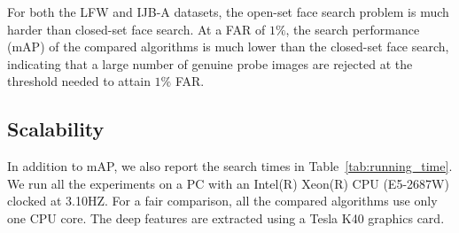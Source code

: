 \documentclass[10pt,journal,compsoc]{IEEEtran}
\begin{document}
For both the LFW and IJB-A datasets, the open-set face search problem is much harder than closed-set face search. At a FAR of $1\%$, the search performance (mAP) of the compared algorithms is much lower than the closed-set face search, indicating that a large number of genuine probe images are rejected at the threshold needed to attain $1\%$ FAR.

\subsection{Scalability}
In addition to mAP, we also report the search times in Table~\ref{tab:running_time}. We run all the experiments on a PC with an Intel(R) Xeon(R) CPU (E5-2687W) clocked at 3.10HZ. For a fair comparison, all the compared algorithms use only one CPU core. The deep features are extracted using a Tesla K40 graphics card.
\end{document}
